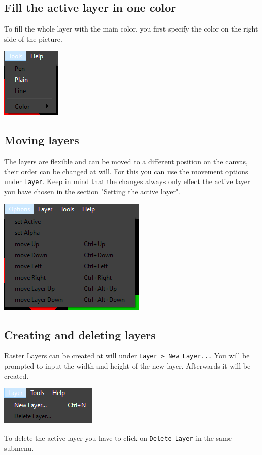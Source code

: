 \documentclass[a4paper, 12pt]{article}
\begin{document}
\subsection{Fill the active layer in one color}
To fill the whole layer with the main color, you first specify the color on the right side of the picture.

\begin{center}
\includegraphics[width=0.3\linewidth,keepaspectratio]{assets/tool-plain}
\end{center}

\subsection{Moving layers}
The layers are flexible and can be moved to a different position on the canvas, their order can be changed at will. For this you can use the movement options under \texttt{Layer}. Keep in mind that the changes always only effect the active layer you have chosen in the section "Setting the active layer".

\begin{center}
\includegraphics[width=0.3\linewidth,keepaspectratio]{assets/layer-options}
\end{center}

\subsection{Creating and deleting layers}
Raster Layers can be created at will under \texttt{Layer > New Layer...} You will be prompted to input the width and height of the new layer. Afterwards it will be created.
\begin{center}
\includegraphics[width=0.3\linewidth,keepaspectratio]{assets/create-layer}
\end{center}
To delete the active layer you have to click on \texttt{Delete Layer} in the same submenu.
\end{document}
